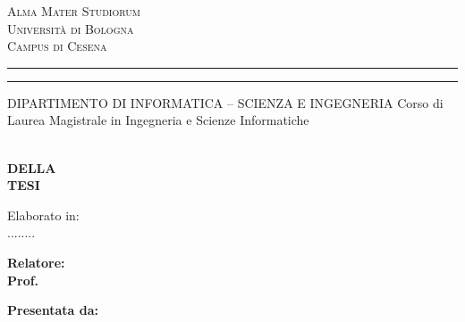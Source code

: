 
\oddsidemargin=25pt

\begin{titlepage}
\begin{center}
{{\Large{\textsc{Alma Mater Studiorum}}}\\
{\Large{\textsc{Universit\`a di Bologna}}} \\
{\textsc{Campus di Cesena}} \rule[0.1cm]{14cm}{0.1mm}
		\rule[0.5cm]{14cm}{0.6mm}
DIPARTIMENTO DI INFORMATICA – SCIENZA E INGEGNERIA
\color{red}Corso di Laurea Magistrale in Ingegneria e Scienze Informatiche }
\end{center}
\vspace{15mm}
\begin{center}
\\
\vspace{3mm}
{\LARGE{\bf DELLA}}\\
\vspace{3mm}
{\LARGE{\bf TESI}}\\
\end{center}
\vspace{15mm}
\begin{center}
 {\large{ Elaborato in:\\
\color{red}........\\}}   
\end{center}
\vspace{20mm}
\par
\noindent
\begin{minipage}[t]{0.47\textwidth}
{\large{\bf Relatore:\\
\color{red}Prof.\\
\xsupervisor}}
\end{minipage}
\hfill
\begin{minipage}[t]{0.47\textwidth}\raggedleft
{\large{\bf Presentata da:\\
\color{red}\xstudent}}
\end{minipage}
\vspace{20mm}
\begin{center}
\end{center}
\end{titlepage}
